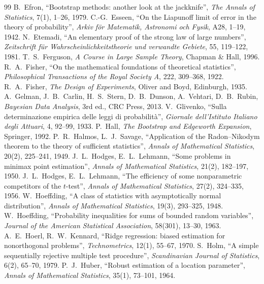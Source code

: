 \documentclass[main.tex]{subfiles}
\begin{document}
\begin{thebibliography}{99}
 B.~Efron, ``Bootstrap methods: another look at the jackknife'', \emph{The Annals of Statistics}, 7(1), 1--26, 1979.
 C.-G.~Esseen, ``On the Liapunoff limit of error in the theory of probability'', \emph{Arkiv för Matematik, Astronomi och Fysik}, A28, 1--19, 1942.
 N.~Etemadi, ``An elementary proof of the strong law of large numbers'', \emph{Zeitschrift für Wahrscheinlichkeitstheorie und verwandte Gebiete}, 55, 119--122, 1981.
 T.~S.~Ferguson, \emph{A Course in Large Sample Theory}, Chapman \& Hall, 1996.
 R.~A.~Fisher, ``On the mathematical foundations of theoretical statistics'', \emph{Philosophical Transactions of the Royal Society A}, 222, 309--368, 1922.
 R.~A.~Fisher, \emph{The Design of Experiments}, Oliver and Boyd, Edinburgh, 1935.
 A.~Gelman, J.~B.~Carlin, H.~S.~Stern, D.~B.~Dunson, A.~Vehtari, D.~B.~Rubin, \emph{Bayesian Data Analysis}, 3rd ed., CRC Press, 2013.
 V.~Glivenko, ``Sulla determinazione empirica delle leggi di probabilità'', \emph{Giornale dell'Istituto Italiano degli Attuari}, 4, 92--99, 1933.
 P.~Hall, \emph{The Bootstrap and Edgeworth Expansion}, Springer, 1992.
 P.~R.~Halmos, L.~J.~Savage, ``Application of the Radon--Nikodym theorem to the theory of sufficient statistics'', \emph{Annals of Mathematical Statistics}, 20(2), 225--241, 1949.
 J.~L.~Hodges, E.~L.~Lehmann, ``Some problems in minimax point estimation'', \emph{Annals of Mathematical Statistics}, 21(2), 182--197, 1950.
 J.~L.~Hodges, E.~L.~Lehmann, ``The efficiency of some nonparametric competitors of the $t$-test'', \emph{Annals of Mathematical Statistics}, 27(2), 324--335, 1956.
 W.~Hoeffding, ``A class of statistics with asymptotically normal distribution'', \emph{Annals of Mathematical Statistics}, 19(3), 293--325, 1948.
 W.~Hoeffding, ``Probability inequalities for sums of bounded random variables'', \emph{Journal of the American Statistical Association}, 58(301), 13--30, 1963.
 A.~E.~Hoerl, R.~W.~Kennard, ``Ridge regression: biased estimation for nonorthogonal problems'', \emph{Technometrics}, 12(1), 55--67, 1970.
 S.~Holm, ``A simple sequentially rejective multiple test procedure'', \emph{Scandinavian Journal of Statistics}, 6(2), 65--70, 1979.
 P.~J.~Huber, ``Robust estimation of a location parameter'', \emph{Annals of Mathematical Statistics}, 35(1), 73--101, 1964.

\end{thebibliography}
\end{document}
